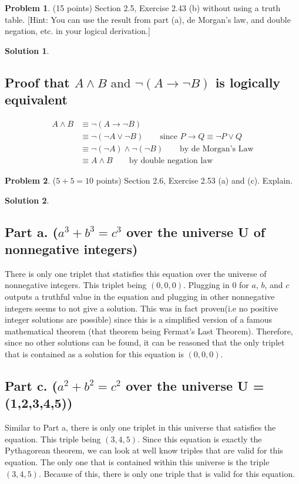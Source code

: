 \documentclass{article}
\theoremstyle{definition}
\newtheorem{problem}{Problem}
\newtheorem*{solution}{Solution}
\begin{document}
\newpage
\begin{problem} (15 points) Section 2.5, Exercise 2.43 (b) without using a truth table.
[Hint: You can use the result from part (a), de Morgan's law, and double negation, etc. 
in your logical derivation.]
\end{problem}
\begin{solution}
\hspace{1cm}
\subsection*{Proof that $A \land B \mbox{ and } \neg(A \rightarrow \neg B)$ is logically equivalent}
\begin{align}
A \land B &\equiv \neg (A \rightarrow \neg B)\\
&\equiv \neg (\neg A \lor \neg B) \quad \quad \mbox{since } P \rightarrow Q \equiv \neg P \lor Q\\
&\equiv \neg (\neg A) \land \neg (\neg B) \quad \quad \mbox{by de Morgan's Law}\\
&\equiv A \land B \quad \quad \mbox{by double negation law}
\end{align}
\setcounter{equation}{0} 
\end{solution}

\newpage
\begin{problem} ($5+5=10$ points) Section 2.6, Exercise 2.53 (a) and (c). Explain.
\end{problem}
\begin{solution}
\hspace{1cm}
\subsection*{Part a. ($a^3 + b^3 = c^3$ over the universe U of nonnegative integers)}
There is only one triplet that statisfies this equation over the universe of nonnegative integers. This triplet being $(0,0,0)$. Plugging in $0$ for $a$, $b$, and $c$ outputs a truthful value in the equation and plugging in other nonnegative integers seems to not give a solution. This was in fact proven(i.e no positive integer solutions are possible) since this is a simplified version of a famous mathematical theorem (that theorem being Fermat's Last Theorem). Therefore, since no other solutions can be found, it can be reasoned that the only triplet that is contained as a solution for this equation is $(0,0,0)$.

\subsection*{Part c. ($a^2 + b^2 = c^2$ over the universe U = (1,2,3,4,5))}
Similar to Part a, there is only one triplet in this universe that satisfies the equation. This triple being $(3,4,5)$. Since this equation is exactly the Pythagorean theorem, we can look at well know triples that are valid for this equation. The only one that is contained within this universe is the triple$(3,4,5)$. Because of this, there is only one triple that is valid for this equation.
\end{solution}
\end{document}
